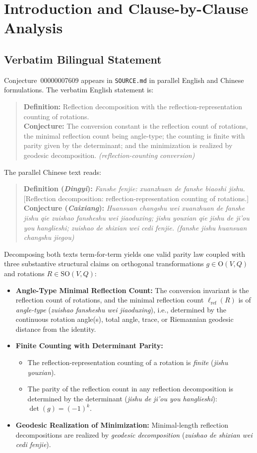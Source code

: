 \documentclass[11pt,a4paper]{article}
\theoremstyle{plain}
\theoremstyle{definition}
\newcommand{\Orth}{\mathrm{O}}
\newcommand{\SO}{\mathrm{SO}}
\newcommand{\lref}{\ell_{\mathrm{ref}}}
\begin{document}
\section{Introduction and Clause-by-Clause Analysis}

\subsection{Verbatim Bilingual Statement}
Conjecture~00000007609 appears in \texttt{SOURCE.md} in parallel English and Chinese formulations. The verbatim English statement is:
\begin{quote}
\textbf{Definition:} Reflection decomposition with the reflection-representation counting of rotations.\\
\textbf{Conjecture:} The conversion constant is the reflection count of rotations, the minimal reflection count being angle-type; the counting is finite with parity given by the determinant; and the minimization is realized by geodesic decomposition. \emph{(reflection-counting conversion)}
\end{quote}
The parallel Chinese text reads:
\begin{quote}
\textbf{Definition (\emph{Dingyi}):} \emph{Fanshe fenjie: xuanzhuan de fanshe biaoshi jishu.} [Reflection decomposition: reflection-representation counting of rotations.]\\
\textbf{Conjecture (\emph{Caixiang}):} \emph{Huansuan changshu wei xuanzhuan de fanshe jishu qie zuishao fansheshu wei jiaoduxing; jishu youxian qie jishu de ji'ou you hanglieshi; zuishao de shixian wei cedi fenjie. (fanshe jishu huansuan changshu jiegou)}
\end{quote}
Decomposing both texts term-for-term yields one valid parity law coupled with three substantive structural claims on orthogonal transformations $g \in \Orth(V, Q)$ and rotations $R \in \SO(V, Q)$:
\begin{itemize}
\item[\textbf{(Claim A)}] \textbf{Angle-Type Minimal Reflection Count:} The conversion invariant is the reflection count of rotations, and the minimal reflection count $\lref(R)$ is of \emph{angle-type} (\emph{zuishao fansheshu wei jiaoduxing}), i.e., determined by the continuous rotation angle(s), total angle, trace, or Riemannian geodesic distance from the identity.
\item[\textbf{(Claim B)}] \textbf{Finite Counting with Determinant Parity:}
  \begin{itemize}
  \item[\textbf{(B1)}] The reflection-representation counting of a rotation is \emph{finite} (\emph{jishu youxian}).
  \item[\textbf{(B2)}] The parity of the reflection count in any reflection decomposition is determined by the determinant (\emph{jishu de ji'ou you hanglieshi}): $\det(g) = (-1)^k$.
  \end{itemize}
\item[\textbf{(Claim C)}] \textbf{Geodesic Realization of Minimization:} Minimal-length reflection decompositions are realized by \emph{geodesic decomposition} (\emph{zuishao de shixian wei cedi fenjie}).
\end{itemize}
\end{document}
